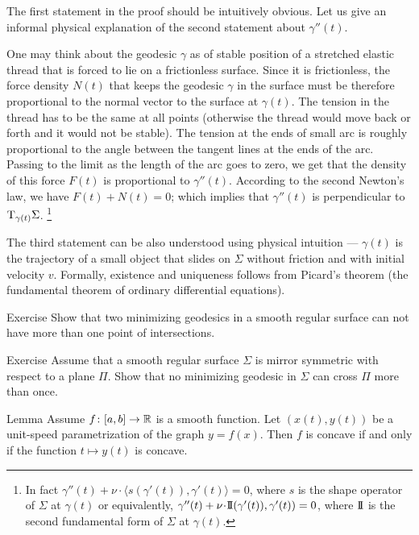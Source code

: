The first statement in the proof should be intuitively obvious.
Let us give an informal physical explanation of the second statement about $\gamma''(t)$.

One may think about the geodesic $\gamma$ as of stable position of a stretched elastic thread that is forced to lie on a frictionless surface.
Since it is frictionless, the force density $N(t)$ that keeps the geodesic $\gamma$ in the surface must be therefore proportional to the normal vector to the surface at $\gamma(t)$.
The tension in the thread has to be the same at all points (otherwise the thread would move back or forth and it would not be stable).
The tension at the ends of small arc is roughly proportional to the angle between the tangent lines at the ends of the arc. 
Passing to the limit as the length of the arc goes to zero, we get that the density of this force $F(t)$ is proportional to $\gamma''(t)$.
According to the second Newton's law, we have $F(t)+N(t)=0$;
which implies that  $\gamma''(t)$ is perpendicular to $\mathrm{T}_{\gamma(t)}\Sigma$.%
\footnote{In fact $\gamma''(t)+\nu\cdot \langle s(\gamma'(t)),\gamma'(t)\rangle=0$, where $s$ is the shape operator of $\Sigma$ at $\gamma(t)$ or equivalently,
$\gamma''(t)+\nu\cdot  \II(\gamma'(t)),\gamma'(t))=0$, where $\mathrm{I}\!\mathrm{I}$ is the second fundamental form of $\Sigma$ at $\gamma(t)$.}

The third statement can be also understood using physical intuition --- $\gamma(t)$ is the trajectory of a small object that slides on $\Sigma$ without friction and with initial velocity $v$.
Formally, existence and uniqueness follows from Picard's theorem (the  fundamental theorem of ordinary differential equations).

\begin{thm}{Exercise}
Show that two minimizing geodesics in a smooth regular surface  can not have more than one point of intersections. 
\end{thm}

\begin{thm}{Exercise}
Assume that a smooth regular surface $\Sigma$ is mirror symmetric with respect to a plane $\Pi$.
Show that no minimizing geodesic in $\Sigma$ can cross $\Pi$ more than once.
\end{thm}



\begin{thm}{Lemma}\label{lem:unit-speed} Assume $f\colon[a,b]\to\mathbb{R}$ is a smooth  function. 
Let $(x(t),y(t))$ be a unit-speed parametrization of the graph $y=f(x)$.
Then $f$ is concave if and only if the function $t\mapsto y(t)$ is concave.
\end{thm}

